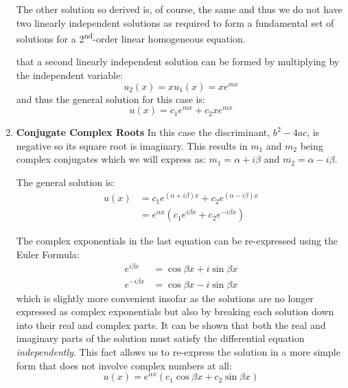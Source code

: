 \begin{enumerate}
The other solution so derived is, of course, the same and thus we do not have two linearly independent solutions as required to form a fundamental set of solutions for a 2\textsuperscript{nd}-order linear homogeneous equation.  

 that a second linearly independent solution can be formed by multiplying by the independent variable:
\begin{equation*}
u_2(x) = x u_1(x) = xe^{mx}
\end{equation*}
and thus the general solution for this case is:
\begin{equation}
u(x) = c_1e^{mx}+c_2xe^{mx}
\label{eq:rep-real-roots}
\end{equation}

\item \textbf{Conjugate Complex Roots}
In this case the discriminant, $b^2-4ac$, is negative so its square root is imaginary.  This results in $m_1$ and $m_2$ being complex conjugates which we will express as: $m_1 = \alpha + i\beta$ and $m_2 = \alpha - i\beta$.

The general solution is:
\begin{align*}
u(x) &= c_1e^{(\alpha + i\beta)x}+c_2e^{(\alpha - i\beta)x} \\
&=e^{\alpha x}\left(c_1e^{i\beta x} + c_2e^{-i\beta x} \right) 
\end{align*}

The complex exponentials in the last equation can be re-expressed using the Euler Formula:
\begin{align*}
e^{i\beta x} &= \cos{\beta x} + i \sin{\beta x} \\
e^{-i\beta x} &= \cos{\beta x} - i \sin{\beta x}
\end{align*}
which is slightly more convenient insofar as the solutions are no longer expressed as complex exponentials but also by breaking each solution down into their real and complex parts. It can be shown that both the real and imaginary parts of the solution must satisfy the differential equation \emph{independently}.  This fact allows us to re-express the solution in a more simple form that does not involve complex numbers at all:
\begin{equation}
u(x) = e^{\alpha x}\left(c_1 \cos{\beta x} + c_2 \sin{\beta x} \right)
\label{eq:cmplx-conj-roots}
\end{equation}


\end{enumerate}
